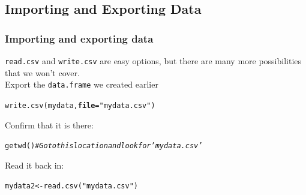 \documentclass[color=usenames,dvipsnames]{beamer}\usepackage[]{graphicx}\usepackage[]{color}
\makeatletter
\newcommand{\hlstr}[1]{\textcolor[rgb]{0.749,0.012,0.012}{#1}}%
\newcommand{\hlcom}[1]{\textcolor[rgb]{0.514,0.506,0.514}{\textit{#1}}}%
\newcommand{\hlstd}[1]{\textcolor[rgb]{0,0,0}{#1}}%
\newcommand{\hlkwb}[1]{\textcolor[rgb]{0,0.341,0.682}{#1}}%
\newcommand{\hlkwc}[1]{\textcolor[rgb]{0,0,0}{\textbf{#1}}}%
\newcommand{\hlkwd}[1]{\textcolor[rgb]{0.004,0.004,0.506}{#1}}%
\newenvironment{kframe}{%
 \def\at@end@of@kframe{}%
 \ifinner\ifhmode%
  \def\at@end@of@kframe{\end{minipage}}%
  \begin{minipage}{\columnwidth}%
 \fi\fi%
 \def\FrameCommand##1{\hskip\@totalleftmargin \hskip-\fboxsep
 \colorbox{shadecolor}{##1}\hskip-\fboxsep
     \hskip-\linewidth \hskip-\@totalleftmargin \hskip\columnwidth}%
 \MakeFramed {\advance\hsize-\width
   \@totalleftmargin\z@ \linewidth\hsize
   \@setminipage}}%
 {\par\unskip\endMakeFramed%
 \at@end@of@kframe}
\newenvironment{knitrout}{}{} %
\makeatother
\begin{document}
\subsection{Importing and Exporting Data}

\begin{frame}[fragile]
  \frametitle{Importing and exporting data}
  \verb+read.csv+ and \verb+write.csv+ are easy options, but there are
  many more possibilities that we won't cover. \\
  \small
  \pause \vfill
  Export the \verb+data.frame+ we created earlier
\begin{knitrout}\small
{}\color{fgcolor}\begin{kframe}
\begin{alltt}
\hlkwd{write.csv}\hlstd{(mydata,} \hlkwc{file}\hlstd{=}\hlstr{"mydata.csv"}\hlstd{)}
\end{alltt}
\end{kframe}
\end{knitrout}
  \pause \vfill
Confirm that it is there:
\begin{knitrout}\scriptsize
{}\color{fgcolor}\begin{kframe}
\begin{alltt}
\hlkwd{getwd}\hlstd{()} \hlcom{# Go to this location and look for 'mydata.csv'}
\end{alltt}
\end{kframe}
\end{knitrout}
  \pause \vfill
Read it back in:
\begin{knitrout}\small
{}\color{fgcolor}\begin{kframe}
\begin{alltt}
\hlstd{mydata2} \hlkwb{<-} \hlkwd{read.csv}\hlstd{(}\hlstr{"mydata.csv"}\hlstd{)}
\end{alltt}
\end{kframe}
\end{knitrout}
\end{frame}
\end{document}
